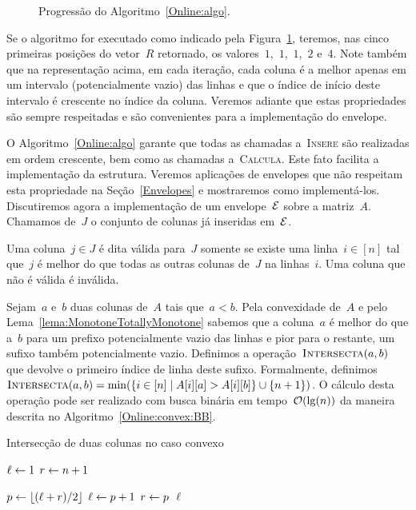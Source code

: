 \begin{figure}[h]
    \centering
    
    \caption{Progressão do Algoritmo~\ref{Online:algo}.} \label{Online:progress:fig}
\end{figure}

Se o algoritmo for executado como indicado pela Figura~\ref{Online:progress:fig}, teremos, nas cinco primeiras posições do vetor~$R$ retornado, os valores~$1$,~$1$,~$1$,~$2$ e~$4$. Note também que na representação acima, em cada iteração, cada coluna é a melhor apenas em um intervalo (potencialmente vazio) das linhas e que o índice de início deste intervalo é crescente no índice da coluna. Veremos adiante que estas propriedades são sempre respeitadas e são convenientes para a implementação do envelope.

O Algoritmo~\ref{Online:algo} garante que todas as chamadas a~\textsc{Insere} são realizadas em ordem crescente, bem como as chamadas a~\textsc{Calcula}. Este fato facilita a implementação da estrutura. Veremos aplicações de envelopes que não respeitam esta propriedade na Seção~\ref{Envelopes} e mostraremos como implementá-los. Discutiremos agora a implementação de um envelope~$\mathcal{E}$ sobre a matriz~$A$. Chamamos de~$J$ o conjunto de colunas já inseridas em~$\mathcal{E}$.

\begin{defi}
Uma coluna~${ j \in J }$ é dita válida para~$J$ somente se existe uma linha~${ i \in [n] }$ tal que~$j$ é melhor do que todas as outras colunas de~$J$ na linhas~$i$. Uma coluna que não é válida é inválida.
\end{defi}

Sejam~$a$ e~$b$ duas colunas de~$A$ tais que~$a < b$. Pela convexidade de~$A$ e pelo Lema~\ref{lema:MonotoneTotallyMonotone} sabemos que a coluna~$a$ é melhor do que a~$b$ para um prefixo potencialmente vazio das linhas e pior para o restante, um sufixo também potencialmente vazio. Definimos a operação~$\textsc{Intersecta}(a,b)$ que devolve o primeiro índice de linha deste sufixo. Formalmente, definimos~${\textsc{Intersecta}(a,b) = \min(\{ i \in [n] \mid A[i][a] > A[i][b] \} \cup \{n+1\})}$. O cálculo desta operação pode ser realizado com busca binária em tempo~$\mathcal{O}(\lg(n))$ da maneira descrita no Algoritmo~\ref{Online:convex:BB}. 

\begin{algorithm}[h]
\caption{Intersecção de duas colunas no caso convexo}
\label{Online:convex:BB}
\begin{algorithmic}[1]
    \State $\ell \leftarrow 1$
    \State $r \leftarrow n+1$

        \State $p \leftarrow \lfloor(\ell + r)/2\rfloor$
         \label{Online:convex:BB:ineq}
            \State $\ell \leftarrow p + 1$
        \Else
            \State $r \leftarrow p$
        \EndIf
    \EndWhile
    \State \Return $\ell$
\EndFunction
\end{algorithmic}
\end{algorithm}

